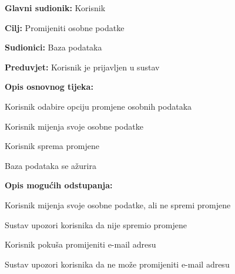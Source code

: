 					\noindent {}
					\begin{packed_item}
	
						\item \textbf{Glavni sudionik: }Korisnik
						\item  \textbf{Cilj:} Promijeniti osobne podatke
						\item  \textbf{Sudionici:} Baza podataka
						\item  \textbf{Preduvjet:} Korisnik je prijavljen u sustav
						\item  \textbf{Opis osnovnog tijeka:}
						
						\item[] \begin{packed_enum}
	
							\item Korisnik odabire opciju promjene osobnih podataka
							\item Korisnik mijenja svoje osobne podatke
							\item Korisnik sprema promjene
							\item Baza podataka se ažurira
						\end{packed_enum}
						
						\item  \textbf{Opis mogućih odstupanja:}
						
						\item[] \begin{packed_item}
	
							\item[2.a] Korisnik mijenja svoje osobne podatke, ali ne spremi promjene
							\item[] \begin{packed_enum}
								
								\item Sustav upozori korisnika da nije spremio promjene
								
							\end{packed_enum}
							
							\item[2.b] Korisnik pokuša promijeniti e-mail adresu
							\item[] \begin{packed_enum}
								
								\item Sustav upozori korisnika da ne može promijeniti e-mail adresu
								
							\end{packed_enum}
							
						\end{packed_item}
					\end{packed_item}
					
